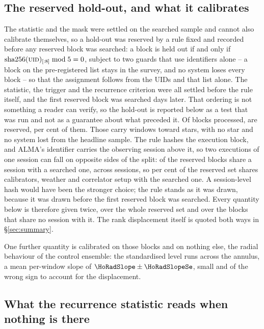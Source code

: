 \subsection{The reserved hold-out, and what it calibrates}
\label{sec:heldout}

The statistic and the mask were settled on the searched sample and cannot also
calibrate themselves, so a hold-out was reserved by a rule fixed and recorded
before any reserved block was searched: a block is held out if and only if
$\mathrm{sha256}(\textsc{uid})_{[:8]} \bmod 5 = 0$, subject to two guards that
use identifiers alone -- a block on the pre-registered list stays in the
survey, and no system loses every block -- so that the assignment follows
from the UIDs and that list alone. The statistic, the trigger and the
recurrence criterion were all settled before the rule itself, and the first
reserved block was searched \HoLeadBlockDays{} days later. That ordering is
not something a reader can verify, so the hold-out is reported below as a
test that was run and not as a guarantee about what preceded it. Of
\NEbProcessedAll{} blocks processed, \NEbHeldOut{} are reserved, \HoPctHeld{}
per cent of them. Those carry \HoWin{} windows toward \HoStars{} stars, with
no star and no system lost from the headline sample. The rule hashes the
execution block, and ALMA's
identifier carries the observing session above it, so two executions of one session can fall on opposite sides of the split:
\BkSessHoBlocks{} of the
\NEbHeldOut{} reserved blocks share a session with a searched one, across
\BkSessShared{} sessions, so \HsSharePct{} per cent of the reserved set shares
calibrators, weather and correlator setup with the searched one. A
session-level hash would have been the stronger choice; the rule stands as it
was drawn, because it was drawn before the first reserved block was searched.
Every quantity below is therefore given twice, over the whole reserved set and
over the \HsIndBlocks{} blocks that share no session with it. The rank
displacement itself is quoted both ways in \S\ref{sec:summary}.

One further quantity is calibrated on those blocks and on nothing else, the
radial behaviour of the control ensemble: the standardised level
runs \HoRadBins{} across the annulus, a mean per-window slope of
$\HoRadSlope\pm\HoRadSlopeSe$, small and of the wrong sign to account for the
displacement.

\subsection{What the recurrence statistic reads when nothing is there}

